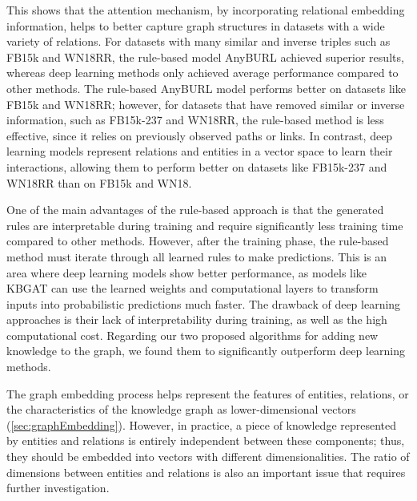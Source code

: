 This shows that the attention mechanism, by incorporating relational embedding information, helps to better capture graph structures in datasets with a wide variety of relations.  
For datasets with many similar and inverse triples such as FB15k and WN18RR, the rule-based model AnyBURL achieved superior results, whereas deep learning methods only achieved average performance compared to other methods.  
The rule-based AnyBURL model performs better on datasets like FB15k and WN18RR; however, for datasets that have removed similar or inverse information, such as FB15k-237 and WN18RR, the rule-based method is less effective, since it relies on previously observed paths or links. In contrast, deep learning models represent relations and entities in a vector space to learn their interactions, allowing them to perform better on datasets like FB15k-237 and WN18RR than on FB15k and WN18.

One of the main advantages of the rule-based approach is that the generated rules are interpretable during training and require significantly less training time compared to other methods. However, after the training phase, the rule-based method must iterate through all learned rules to make predictions. This is an area where deep learning models show better performance, as models like KBGAT can use the learned weights and computational layers to transform inputs into probabilistic predictions much faster. The drawback of deep learning approaches is their lack of interpretability during training, as well as the high computational cost. Regarding our two proposed algorithms for adding new knowledge to the graph, we found them to significantly outperform deep learning methods.






The graph embedding process helps represent the features of entities, relations, or the characteristics of the knowledge graph as lower-dimensional vectors (\autoref{sec:graphEmbedding}). However, in practice, a piece of knowledge represented by entities and relations is entirely independent between these components; thus, they should be embedded into vectors with different dimensionalities. The ratio of dimensions between entities and relations is also an important issue that requires further investigation. 

